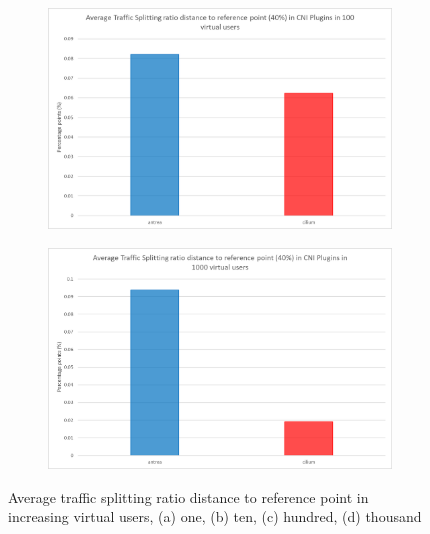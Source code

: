 \begin{figure}[H]
    \begin{subfigure}[b]{0.48\textwidth}
        \includegraphics[width=\textwidth]{plots/traffic-splitting/time_window_5_100vu_reference_cloud.png}
        \label{fig:reference_100vu}
        \caption{}
    \end{subfigure}
    \begin{subfigure}[b]{0.48\textwidth}
        \includegraphics[width=\textwidth]{plots/traffic-splitting/time_window_5_1000vu_reference_cloud.png}
        \label{fig:reference_1000vu}
        \caption{}
    \end{subfigure}

    \caption{Average traffic splitting ratio distance to reference point in increasing virtual users, (a) one, (b) ten, (c) hundred, (d) thousand }
    \label{fig:referencesIngress}
\end{figure}
